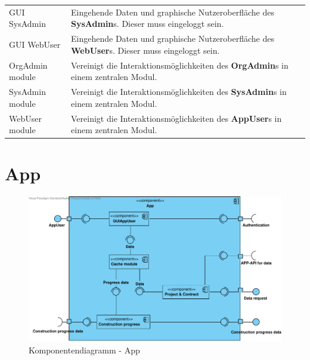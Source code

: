 \begin{longtable}[h]{p{4cm} p{10.0cm}}
	\rowcolor[HTML]{E7E7E7} 
	GUI SysAdmin & Eingehende Daten und graphische Nutzeroberfläche des \textbf{SysAdmin}s. Dieser muss eingeloggt sein. \\
	
	GUI WebUser & Eingehende Daten und graphische Nutzeroberfläche des \textbf{WebUser}s. Dieser muss eingeloggt sein. \\
	
	\rowcolor[HTML]{E7E7E7} 
	OrgAdmin module & Vereinigt die Interaktionsmöglichkeiten des \textbf{OrgAdmin}s in einem zentralen Modul. \\
	
	SysAdmin module & Vereinigt die Interaktionsmöglichkeiten des \textbf{SysAdmin}s in einem zentralen Modul. \\
	
	\rowcolor[HTML]{E7E7E7} 
	WebUser module & Vereinigt die Interaktionsmöglichkeiten des \textbf{AppUser}s in einem zentralen Modul.
\end{longtable}

\clearpage

\section{App}

\begin{figure}[H]
	\centering
	\includegraphics[width=16cm]{img/diagrams/Component-App.pdf}
	\caption{Komponentendiagramm - App}
	\label{fig:komponentendiagramm-app}
\end{figure}


